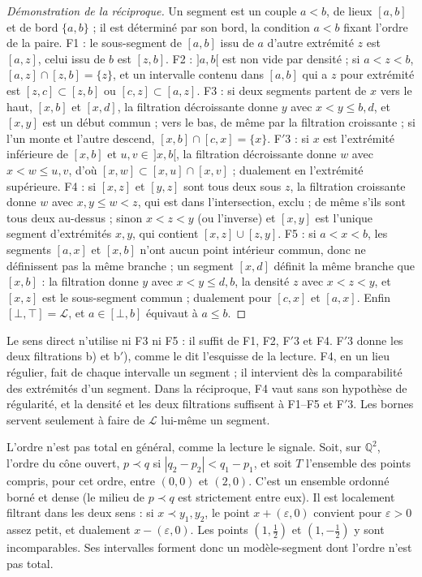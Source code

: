 \begin{proof}[Démonstration de la réciproque]
Un segment est un couple $a < b$, de lieux $[a,b]$ et de bord $\{a,b\}$ ; il est déterminé par son bord, la condition $a<b$ fixant l'ordre de la paire. F1 : le sous-segment de $[a,b]$ issu de $a$ d'autre extrémité $z$ est $[a,z]$, celui issu de $b$ est $[z,b]$. F2 : $]a,b[$ est non vide par densité ; si $a < z < b$, $[a,z] \cap [z,b] = \{z\}$, et un intervalle contenu dans $[a,b]$ qui a $z$ pour extrémité est $[z,c] \subset [z,b]$ ou $[c,z] \subset [a,z]$. F3 : si deux segments partent de $x$ vers le haut, $[x,b]$ et $[x,d]$, la filtration décroissante donne $y$ avec $x < y \leq b, d$, et $[x,y]$ est un début commun ; vers le bas, de même par la filtration croissante ; si l'un monte et l'autre descend, $[x,b] \cap [c,x] = \{x\}$. F$'$3 : si $x$ est l'extrémité inférieure de $[x,b]$ et $u, v \in\, ]x,b[$, la filtration décroissante donne $w$ avec $x < w \leq u, v$, d'où $[x,w] \subset [x,u] \cap [x,v]$ ; dualement en l'extrémité supérieure. F4 : si $[x,z]$ et $[y,z]$ sont tous deux sous $z$, la filtration croissante donne $w$ avec $x, y \leq w < z$, qui est dans l'intersection, exclu ; de même s'ils sont tous deux au-dessus ; sinon $x < z < y$ (ou l'inverse) et $[x,y]$ est l'unique segment d'extrémités $x,y$, qui contient $[x,z] \cup [z,y]$. F5 : si $a < x < b$, les segments $[a,x]$ et $[x,b]$ n'ont aucun point intérieur commun, donc ne définissent pas la même branche ; un segment $[x,d]$ définit la même branche que $[x,b]$ : la filtration donne $y$ avec $x < y \leq d, b$, la densité $z$ avec $x < z < y$, et $[x,z]$ est le sous-segment commun ; dualement pour $[c,x]$ et $[a,x]$. Enfin $[\bot,\top] = \mathcal L$, et $a \in [\bot,b]$ équivaut à $a \leq b$.
\end{proof}

\begin{remarque}
Le sens direct n'utilise ni F3 ni F5 : il suffit de F1, F2, F$'$3 et F4. F$'$3 donne les deux filtrations b) et b$'$), comme le dit l'esquisse de la lecture. F4, en un lieu régulier, fait de chaque intervalle un segment ; il intervient dès la comparabilité des extrémités d'un segment. Dans la réciproque, F4 vaut sans son hypothèse de régularité, et la densité et les deux filtrations suffisent à F1--F5 et F$'$3. Les bornes servent seulement à faire de $\mathcal L$ lui-même un segment.
\end{remarque}

\begin{remarque}
L'ordre n'est pas total en général, comme la lecture le signale. Soit, sur $\mathbb Q^2$, l'ordre du cône ouvert, $p \prec q$ si $|q_2 - p_2| < q_1 - p_1$, et soit $T$ l'ensemble des points compris, pour cet ordre, entre $(0,0)$ et $(2,0)$. C'est un ensemble ordonné borné et dense (le milieu de $p \prec q$ est strictement entre eux). Il est localement filtrant dans les deux sens : si $x \prec y_1, y_2$, le point $x + (\varepsilon, 0)$ convient pour $\varepsilon > 0$ assez petit, et dualement $x - (\varepsilon, 0)$. Les points $(1, \tfrac12)$ et $(1, -\tfrac12)$ y sont incomparables. Ses intervalles forment donc un modèle-segment dont l'ordre n'est pas total.
\end{remarque}

